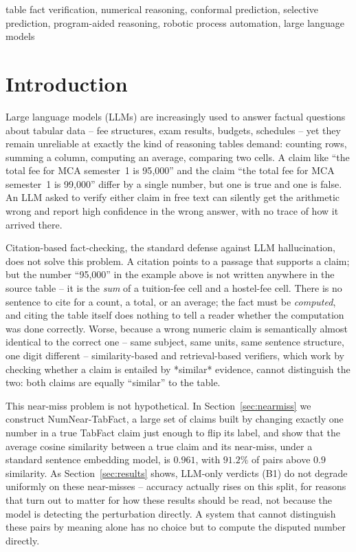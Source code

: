 \documentclass[journal]{IEEEtran}
\begin{document}
\begin{IEEEkeywords}
table fact verification, numerical reasoning, conformal prediction, selective
prediction, program-aided reasoning, robotic process automation, large
language models
\end{IEEEkeywords}

\section{Introduction}
\label{sec:intro}

Large language models (LLMs) are increasingly used to answer factual
questions about tabular data -- fee structures, exam results, budgets,
schedules -- yet they remain unreliable at exactly the kind of reasoning
tables demand: counting rows, summing a column, computing an average,
comparing two cells. A claim like ``the total fee for MCA semester~1 is
95{,}000'' and the claim ``the total fee for MCA semester~1 is 99{,}000''
differ by a single number, but one is true and one is false. An LLM asked to
verify either claim in free text can silently get the arithmetic wrong and
report high confidence in the wrong answer, with no trace of how it arrived
there.

Citation-based fact-checking, the standard defense against LLM
hallucination, does not solve this problem. A citation points to a passage
that supports a claim; but the number ``95{,}000'' in the example above is
not written anywhere in the source table -- it is the \emph{sum} of a
tuition-fee cell and a hostel-fee cell. There is no sentence to cite for a
count, a total, or an average; the fact must be \emph{computed}, and citing
the table itself does nothing to tell a reader whether the computation was
done correctly. Worse, because a wrong numeric claim is semantically almost
identical to the correct one -- same subject, same units, same sentence
structure, one digit different -- similarity-based and retrieval-based
verifiers, which work by checking whether a claim is entailed by *similar*
evidence, cannot distinguish the two: both claims are equally ``similar'' to
the table.

This near-miss problem is not hypothetical. In
Section~\ref{sec:nearmiss} we construct NumNear-TabFact, a large set of
claims built by changing exactly one number in a true TabFact claim just
enough to flip its label, and show that the average cosine similarity
between a true claim and its near-miss, under a standard sentence embedding
model, is $0.961$, with $91.2\%$ of pairs above $0.9$
similarity. As Section~\ref{sec:results} shows, LLM-only verdicts (B1) do
not degrade uniformly on these near-misses -- accuracy actually rises on
this split, for reasons that turn out to matter for how these results should
be read, not because the model is detecting the perturbation directly. A
system that cannot distinguish these pairs by meaning alone has no choice
but to compute the disputed number directly.
\end{document}
